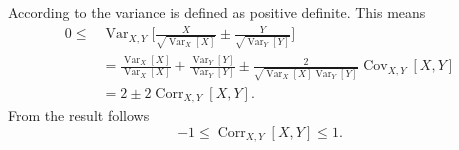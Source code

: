 \begin{example}
	According to  the variance is defined as positive definite. This means
	\begin{equation}
		\label{eq:corr_deriv}
		\begin{split}
			0\leq& \operatorname{Var}_{X,Y}\bigg[\frac{X}{\sqrt{\operatorname{Var}_{X}[X]}}\pm\frac{Y}{\sqrt{\operatorname{Var}_{Y}[Y]}}\bigg]\\
			& = \frac{\operatorname{Var}_X[X]}{\operatorname{Var}_{X}[X]}+\frac{\operatorname{Var}_Y[Y]}{\operatorname{Var}_{Y}[Y]}\pm \frac{2}{\sqrt{\operatorname{Var}_{X}[X]\operatorname{Var}_{Y}[Y]}}\operatorname{Cov}_{X,Y}[X,Y]\\
			& = 2\pm 2\operatorname{Corr}_{X,Y}[X,Y].
		\end{split}
	\end{equation}
	 From  the result follows
	\begin{equation}
		-1\leq \operatorname{Corr}_{X,Y}[X,Y]\leq 1.
	\end{equation}	
\end{example}

